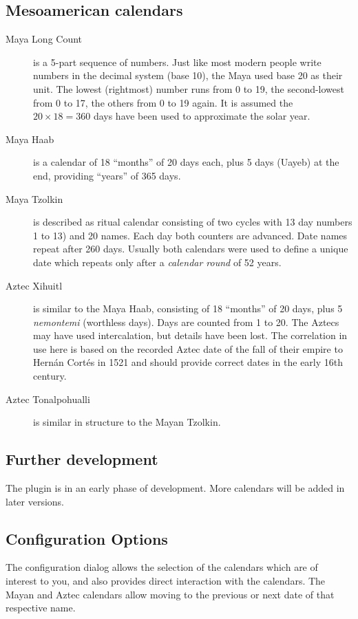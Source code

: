 \subsection{Mesoamerican calendars}
\begin{description}
\item[Maya Long Count] is a 5-part sequence of numbers. Just like most
  modern people write numbers in the decimal system (base 10), the
  Maya used base 20 as their unit. The lowest (rightmost) number runs
  from 0 to 19, the second-lowest from 0 to 17, the others from 0 to
  19 again. It is assumed the $20\times18=360$ days have been used to
  approximate the solar year.
\item[Maya Haab] is a calendar of 18 ``months'' of 20 days each, plus
  5 days (Uayeb) at the end, providing ``years'' of 365 days.
\item[Maya Tzolkin] is described as ritual calendar consisting of two
  cycles with 13 day numbers 1 to 13) and 20 names. Each day both
  counters are advanced. Date names repeat after 260 days. Usually
  both calendars were used to define a unique date which repeats only
  after a \emph{calendar round} of 52 years.
\item[Aztec Xihuitl] is similar to the Maya Haab, consisting of 18
  ``months'' of 20 days, plus 5 \emph{nemontemi} (worthless
  days). Days are counted from 1 to 20. The Aztecs may have used
  intercalation, but details have been lost. The correlation in use
  here is based on the recorded Aztec date of the fall of their empire
  to Hern\'an Cort\'es in 1521 and should provide correct dates in the
  early 16th century.
\item[Aztec Tonalpohualli] is similar in structure to the Mayan Tzolkin.
\end{description}

\subsection{Further development}
The plugin is in an early phase of development. More calendars will be added in later versions. 


\subsection{Configuration Options}
\label{sec:plugin:Calendars:configuration}

The configuration dialog allows the selection of the calendars which are
of interest to you, and also provides direct interaction with the calendars.
The Mayan and Aztec calendars allow moving to the previous or next date of that respective name. 


